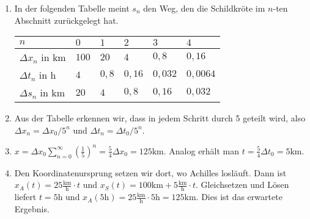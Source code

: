 \item 

\begin{enumerate}
\item In der folgenden Tabelle meint $s_n$ den Weg, den die Schildkröte im $n$-ten Abschnitt zurückgelegt hat.

\begin{tabular}{l|lllll}
$n$          & $0$   & $1$   & $2$    & $3$     & $4$      \\	
\hline
$\Delta x_n$ in km & $100$ & $20$  & $4$    & $0{,}8$   & $0{,}16$   \\
$\Delta t_n$ in h & $4$   & $0{,}8$ & $0{,}16$ & $0{,}032$ & $0{,}0064$ \\
$\Delta s_n$ in km & $20$  & $4$   & $0{,}8$  & $0{,}16$  & $0{,}032$ 
\end{tabular}

\item Aus der Tabelle erkennen wir, dass in jedem Schritt durch 5 geteilt wird, also $\Delta x_n = \Delta x_0 / 5^n$ und $\Delta t_n = \Delta t_0 / 5^n$.
\item $x = \Delta x_0 \sum_{n=0}^{\infty}(\frac{1}{5})^n = \frac{5}{4} \Delta x_0 = 125\text{km}$. Analog erhält man $t = \frac{5}{4} \Delta t_0 = 5\text{km}$.
\item Den Koordinatenursprung setzen wir dort, wo Achilles losläuft. Dann ist $x_A(t) = 25\frac{\text{km}}{\text{h}}\cdot t$ und $x_S(t) = 100\text{km}+5\frac{\text{km}}{\text{h}}\cdot t$. Gleichsetzen und Lösen liefert $t=5\text{h}$ und $x_A(\text{5h}) = 25\frac{\text{km}}{\text{h}}\cdot \text{5h} = 125\text{km}$. Dies ist das erwartete Ergebnis.

\end{enumerate}

